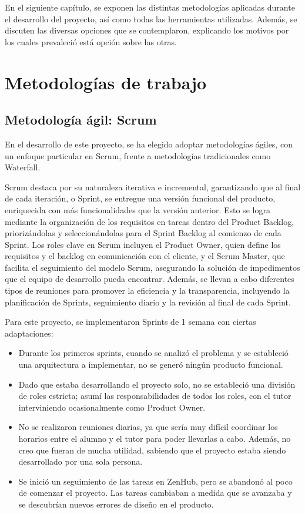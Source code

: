 
En el siguiente capítulo, se exponen las distintas metodologías aplicadas durante el desarrollo del proyecto, así como todas las herramientas utilizadas. Además, se discuten las diversas opciones que se contemplaron, explicando los motivos por los cuales prevaleció está opción sobre las otras.


\section{Metodologías de trabajo}

\subsection{Metodología ágil: Scrum}

En el desarrollo de este proyecto, se ha elegido adoptar metodologías ágiles, con un enfoque particular en Scrum\cite{ScrumAgile}, frente a metodologías tradicionales como Waterfall.

Scrum destaca por su naturaleza iterativa e incremental, garantizando que al final de cada iteración, o Sprint, se entregue una versión funcional del producto, enriquecida con más funcionalidades que la versión anterior. Esto se logra mediante la organización de los requisitos en tareas dentro del Product Backlog, priorizándolas y seleccionándolas para el Sprint Backlog al comienzo de cada Sprint. Los roles clave en Scrum incluyen el Product Owner, quien define los requisitos y el backlog en comunicación con el cliente, y el Scrum Master, que facilita el seguimiento del modelo Scrum, asegurando la solución de impedimentos que el equipo de desarrollo pueda encontrar. Además, se llevan a cabo diferentes tipos de reuniones para promover la eficiencia y la transparencia, incluyendo la planificación de Sprints, seguimiento diario y la revisión al final de cada Sprint.

Para este proyecto, se implementaron Sprints de 1 semana con ciertas adaptaciones:

\begin{itemize}
    \item Durante los primeros sprints, cuando se analizó el problema y se estableció una arquitectura a implementar, no se generó ningún producto funcional.
    \item Dado que estaba desarrollando el proyecto solo, no se estableció una división de roles estricta; asumí las responsabilidades de todos los roles, con el tutor interviniendo ocasionalmente como Product Owner.
    \item No se realizaron reuniones diarias, ya que sería muy difícil coordinar los horarios entre el alumno y el tutor para poder llevarlas a cabo. Además, no creo que fueran de mucha utilidad, sabiendo que el proyecto estaba siendo desarrollado por una sola persona.
    \item Se inició un seguimiento de las tareas en ZenHub, pero se abandonó al poco de comenzar el proyecto. Las tareas cambiaban a medida que se avanzaba y se descubrían nuevos errores de diseño en el producto.
\end{itemize}

